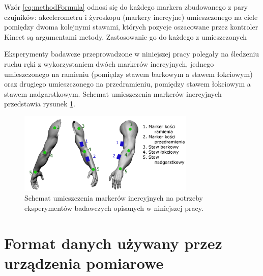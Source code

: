 Wzór \eqref{eq:methodFormula} odnosi się do każdego markera zbudowanego z pary czujników: akcelerometru i żyroskopu (markery inercyjne) umieszczonego na ciele pomiędzy dwoma kolejnymi stawami, których pozycje oszacowane przez kontroler Kinect są argumentami metody. Zastosowanie go do każdego z umieszczonych 

Eksperymenty badawcze przeprowadzone w niniejszej pracy polegały na śledzeniu 
ruchu ręki z wykorzystaniem dwóch markerów inercyjnych, jednego umieszczonego na ramieniu (pomiędzy stawem barkowym a stawem łokciowym) oraz drugiego umieszczonego na przedramieniu, pomiędzy stawem łokciowym a stawem nadgarstkowym. Schemat umieszczenia markerów inercyjnych przedstawia rysunek \ref{fig:hybrid:imuMarkerPlacementSample}.
\begin{figure}[!htp]
	\centering	
	\includegraphics[width=0.75\textwidth]{images/imuArm.png}
	\caption{Schemat umieszczenia markerów inercyjnych na potrzeby eksperymentów badawczych opisanych w niniejszej pracy.}
	\label{fig:hybrid:imuMarkerPlacementSample}
\end{figure}

\section{Format danych używany przez urządzenia pomiarowe}
